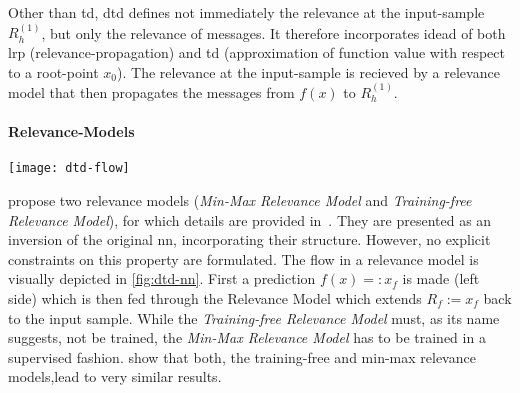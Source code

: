\par
Other than \gls{td}, \gls{dtd} defines not immediately the relevance at the input-sample \(R_{h}^{(1)}\), but only the relevance of \glspl{message}. It therefore incorporates idead of both \gls{lrp} (relevance-propagation) and \gls{td} (approximation of function value with respect to a root-point \(x_0\)). The relevance at the input-sample is recieved by a relevance model that then propagates the \glspl{message} from \(f(x)\) to \(R_{h}^{(1)}\).
\paragraph{Relevance-Models}
\begin{figure*}[h]
    \center
    \texttt{[image: dtd-flow]}
    \caption{\textbf{Left:} A neural network at prediction time. \textbf{Right:} exemplary \gls{dtd} Relevance Model, adopted from \protect\cite{Montavon.2017}. Note, that in this work, usually \(R_h\) is used instead of \(R_p\).}\label{fig:dtd-nn}
\end{figure*}
 propose two relevance models (\textit{Min-Max Relevance Model} and \textit{Training-free Relevance Model}), for which details are provided in~\cite{Montavon.2017}. They are presented as an inversion of the original \gls{nn}, incorporating their structure. However, no explicit constraints on this property are formulated. The flow in a relevance model is visually depicted in \cref{fig:dtd-nn}. First a prediction \(f(x)=:x_f\) is made (left side) which is then fed through the Relevance Model which extends \(R_f:=x_f\) back to the input sample. While the \textit{Training-free Relevance Model} must, as its name suggests, not be trained, the \textit{Min-Max Relevance Model} has to be trained in a supervised fashion.  show that both, the training-free and min-max relevance models,lead to very similar results.